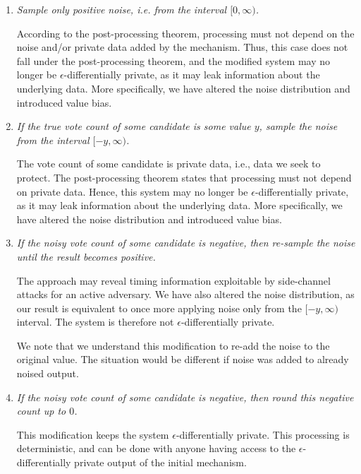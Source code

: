 \documentclass[parskip=half]{scrartcl}
\begin{document}
\begin{enumerate}
    \item \textit{Sample only positive noise, i.e. from the interval
    $[0, \infty)$.}

    According to the post-processing theorem, processing must not depend on the
    noise and/or private data added by the mechanism. Thus, this case does not
    fall under the post-processing theorem, and the modified system may no
    longer be $\epsilon$-differentially private, as it may leak information
    about the underlying data. More specifically, we have altered the noise
    distribution and introduced value bias.

    \item \textit{If the true vote count of some candidate is some value $y$,
    sample the noise from the interval $[-y, \infty)$.}

    The vote count of some candidate is private data, i.e., data we seek to
    protect. The post-processing theorem states that processing must not depend
    on private data. Hence, this system may no longer be
    $\epsilon$-differentially private, as it may leak information about the
    underlying data. More specifically, we have altered the noise distribution
    and introduced value bias.

    \item \textit{If the noisy vote count of some candidate is negative, then
    re-sample the noise until the result becomes positive.}
    
    The approach may reveal timing information exploitable by side-channel
    attacks for an active adversary. We have also altered the noise
    distribution, as our result is equivalent to once more applying noise only
    from the $[-y, \infty)$ interval. The system is therefore
    not $\epsilon$-differentially private.

    We note that we understand this modification to re-add the noise to the
    original value. The situation would be different if noise was added to
    already noised output.

    \item \textit{If the noisy vote count of some candidate is negative, then
    round this negative count up to $0$.}

    This modification keeps the system $\epsilon$-differentially private. This
    processing is deterministic, and can be done with anyone having access to
    the $\epsilon$-differentially private output of the initial mechanism.
\end{enumerate}
\end{document}
